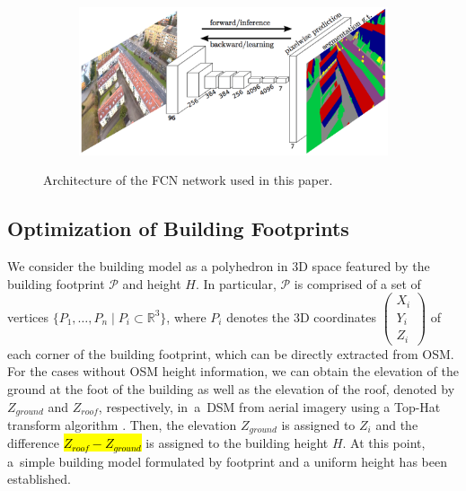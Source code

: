 \documentclass[remotesensing,article,accept,moreauthors,pdftex,10pt,a4paper]{mdpi}
\theoremstyle{mdpi}
\newcounter{thm}
\newcounter{ex}
\newcounter{re}
\newcommand{\icol}[1]{%
  \left(\begin{smallmatrix}#1\end{smallmatrix}\right)%
}
\newcommand{\irow}[1]{%
  \begin{smallmatrix}(#1)\end{smallmatrix}%
}
\begin{document}
\begin{figure}[H]
    \centering
       \begin{subfigure}[tbp]{0.9\columnwidth}
           \centering
           \includegraphics[width=\textwidth]{method/structure.png}
           
                    
       \end{subfigure}
       \caption{Architecture of the FCN network used in this paper.}
       \label{fig:archi}
\end{figure}



\subsection{Optimization of Building Footprints}

We consider the building model as a polyhedron in 3D space featured by the building footprint $\mathscr{P}$ and height $H$. In particular, $\mathscr{P}$ is comprised of a set of vertices $\{ P_{1},  \ldots ,  P_{n} \mid  P_{i} \subset \mathbb{R}^3 \}$, where $P_{i}$ denotes the 3D coordinates $\icol{X_{i}\\Y_{i}\\Z_{i}}$ of each corner of the building footprint, which can be directly extracted from OSM. For the cases without OSM height information, we can obtain the elevation of the ground at the foot of the building as well as the elevation of the roof, denoted by $Z_{ground}$ and $Z_{roof}$, respectively, in~a~DSM from aerial imagery using a Top-Hat transform algorithm \cite{shih2009image,Mongus2012tophat}. Then, the elevation $Z_{ground}$ is assigned to $Z_{i}$ and the difference \hl{$Z_{roof} - Z_{ground}$} is assigned to the building height $H$. At this point, a~simple building model formulated by footprint and a uniform height has been established.

%
\end{document}
